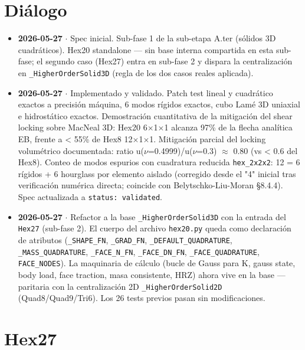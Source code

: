 \documentclass[11pt,letterpaper,oneside]{report}
\begin{document}
\section{Diálogo}

\begin{itemize}
  \item \textbf{2026-05-27} \ensuremath{\cdot} Spec inicial. Sub-fase 1 de la sub-etapa A.ter (sólidos 3D cuadráticos). Hex20 standalone --- sin base interna compartida en esta sub-fase; el segundo caso (Hex27) entra en sub-fase 2 y dispara la centralización en \texttt{\_HigherOrderSolid3D} (regla de los dos casos reales aplicada).
  \item \textbf{2026-05-27} \ensuremath{\cdot} Implementado y validado. Patch test lineal y cuadrático exactos a precisión máquina, 6 modos rígidos exactos, cubo Lamé 3D uniaxial e hidrostático exactos. Demostración cuantitativa de la mitigación del shear locking sobre MacNeal 3D: Hex20 6\ensuremath{\times}1\ensuremath{\times}1 alcanza 97\% de la flecha analítica EB, frente a < 55\% de Hex8 12\ensuremath{\times}1\ensuremath{\times}1. Mitigación parcial del locking volumétrico documentada: ratio u(\ensuremath{\nu}=0.4999)/u(\ensuremath{\nu}=0.3) \ensuremath{\approx} 0.80 (vs < 0.6 del Hex8). Conteo de modos espurios con cuadratura reducida \texttt{hex\_2x2x2}: 12 = 6 rígidos + 6 hourglass por elemento aislado (corregido desde el "4" inicial tras verificación numérica directa; coincide con Belytschko-Liu-Moran §8.4.4). Spec actualizada a \texttt{status: validated}.
  \item \textbf{2026-05-27} \ensuremath{\cdot} Refactor a la base \texttt{\_HigherOrderSolid3D} con la entrada del \texttt{Hex27} (sub-fase 2). El cuerpo del archivo \texttt{hex20.py} queda como declaración de atributos (\texttt{\_SHAPE\_FN}, \texttt{\_GRAD\_FN}, \texttt{\_DEFAULT\_QUADRATURE}, \texttt{\_MASS\_QUADRATURE}, \texttt{\_FACE\_N\_FN}, \texttt{\_FACE\_DN\_FN}, \texttt{\_FACE\_QUADRATURE}, \texttt{FACE\_NODES}). La maquinaria de cálculo (bucle de Gauss para K, gauss state, body load, face traction, masa consistente, HRZ) ahora vive en la base --- paritaria con la centralización 2D \texttt{\_HigherOrderSolid2D} (Quad8/Quad9/Tri6). Los 26 tests previos pasan sin modificaciones.
\end{itemize}


\newpage

\section{Hex27}
\end{document}
